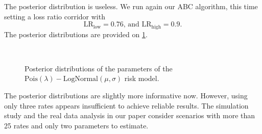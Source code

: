 \documentclass[10pt]{article}
\begin{document}
The posterior distribution is useless. We run again our ABC algorithm, this time setting a loss ratio corridor with 
$$
\text{LR}_{\text{low}} = 0.76\text{, and }\text{LR}_{\text{high}} = 0.9. 
$$
The posterior distributions are provided on \cref{fig:posterior_commercial_premium_w_reg_miss}. 
\begin{figure}[!ht]
  \begin{center}
    \\
    \caption{Posterior distributions of the parameters of the $\text{Pois}(\lambda)-\text{LogNormal}(\mu , \sigma)$ risk model.}
    \label{fig:posterior_commercial_premium_w_reg_miss}
  \end{center}
\end{figure}

The posterior distributions are slightly more informative now. However, using only three rates appears insufficient to achieve reliable results. The simulation study and the real data analysis in our paper consider scenarios with more than 25 rates and only two parameters to estimate.




\end{document}
